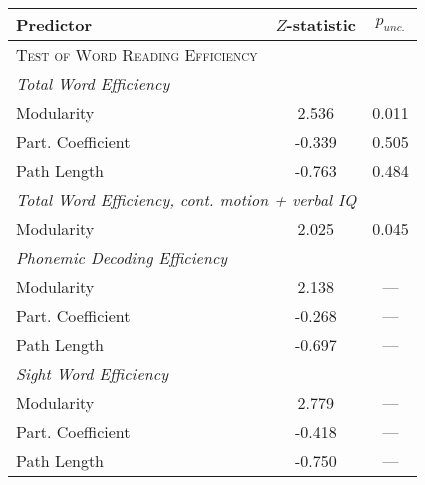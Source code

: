 \begin{tabular}{lcc}
\toprule
Predictor   &  $Z$-statistic &  $p_{unc.}$ \\
\midrule
\textsc{Test of Word Reading Efficiency} & & \\
\textit{Total Word Efficiency} & & \\
    \hspace{5pt}Modularity &  2.536 &  0.011 \\
    \hspace{5pt}Part. Coefficient & -0.339 &  0.505 \\
    \hspace{5pt}Path Length & -0.763 &  0.484 \\
\multicolumn{2}{l}{\textit{Total Word Efficiency, cont. motion + verbal IQ}} \\
    \hspace{5pt}Modularity  & 2.025 & 0.045 \\
\textit{Phonemic Decoding Efficiency} & & \\
    \hspace{5pt}Modularity  &  2.138 &  --- \\
    \hspace{5pt}Part. Coefficient & -0.268 &  --- \\
    \hspace{5pt}Path Length & -0.697 &  --- \\
\textit{Sight Word Efficiency} & & \\
    \hspace{5pt}Modularity  &  2.779 &  --- \\
    \hspace{5pt}Part. Coefficient & -0.418 &  --- \\
    \hspace{5pt}Path Length & -0.750 &  --- \\
\bottomrule
\end{tabular}